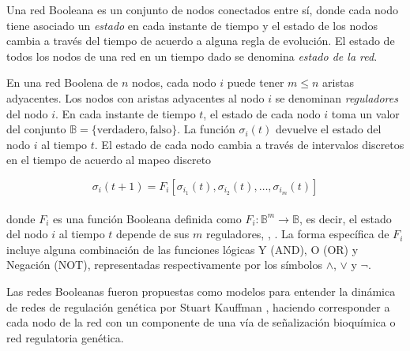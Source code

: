 
Una red Booleana es un conjunto de nodos conectados entre sí, donde cada nodo tiene asociado un \emph{estado} en cada instante de tiempo y el estado de los nodos cambia a través del tiempo de acuerdo a alguna regla de evolución. El estado de todos los nodos de una red en un tiempo dado se denomina \emph{estado de la red}. 

En una red Boolena de $n$ nodos, cada nodo $i$ puede tener $m \le n $ aristas adyacentes. Los nodos con aristas adyacentes al nodo $i$ se denominan \emph{reguladores} del nodo $i$. En cada instante de tiempo $t$, el estado de cada nodo $i$ toma un valor del conjunto $\mathbb{B} = \{\mathrm{verdadero}, \mathrm{falso}\}$. La función $\sigma_i(t)$ devuelve el estado del nodo $i$ al tiempo $t$. El estado de cada nodo cambia a través de intervalos discretos en el tiempo de acuerdo al mapeo discreto

\begin{equation}\label{eqn:kaufman}
\sigma_i(t+1) = F_i[\sigma_{i_1}(t), \sigma_{i_2}(t),\ldots, \sigma_{i_m}(t)]
\end{equation}
\\
donde $F_i$ es una función Booleana definida como $F_i: \mathbb{B}^{m} \rightarrow \mathbb{B}$, es decir, el estado del nodo $i$ al tiempo $t$ depende de sus $m$ reguladores,  \citeauthor{Kauffman:1969up} \citep{Kauffman:1969up}, \citeauthor{Gershenson:2004uq} \citep{Gershenson:2004uq}. La forma específica de $F_i$ incluye alguna combinación de las funciones lógicas Y (AND), O (OR) y Negación (NOT), representadas respectivamente por los símbolos $\land$, $\lor$ y $\neg$.

Las redes Booleanas fueron propuestas como modelos para entender la dinámica de redes de regulación genética por Stuart Kauffman \citeauthor{Kauffman:1969up} \citep{Kauffman:1969up}, haciendo corresponder a cada nodo de la red con un componente de una vía de señalización  bioquímica o red regulatoria genética. 

